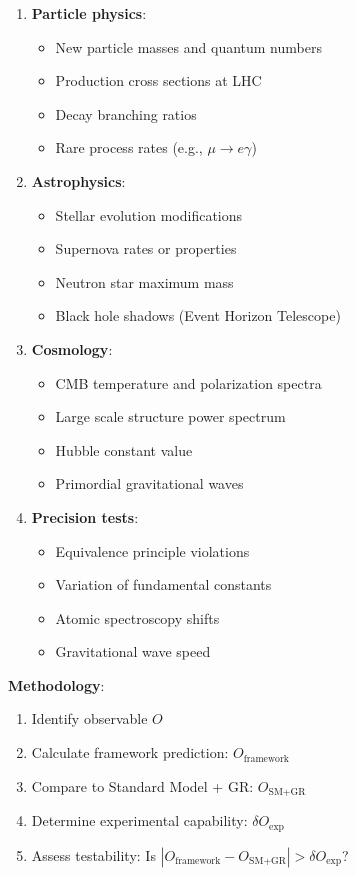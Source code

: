 \begin{enumerate}
    \item \textbf{Particle physics}:
    \begin{itemize}
        \item New particle masses and quantum numbers
        \item Production cross sections at LHC
        \item Decay branching ratios
        \item Rare process rates (e.g., $\mu \to e\gamma$)
    \end{itemize}

    \item \textbf{Astrophysics}:
    \begin{itemize}
        \item Stellar evolution modifications
        \item Supernova rates or properties
        \item Neutron star maximum mass
        \item Black hole shadows (Event Horizon Telescope)
    \end{itemize}

    \item \textbf{Cosmology}:
    \begin{itemize}
        \item CMB temperature and polarization spectra
        \item Large scale structure power spectrum
        \item Hubble constant value
        \item Primordial gravitational waves
    \end{itemize}

    \item \textbf{Precision tests}:
    \begin{itemize}
        \item Equivalence principle violations
        \item Variation of fundamental constants
        \item Atomic spectroscopy shifts
        \item Gravitational wave speed
    \end{itemize}
\end{enumerate}

\textbf{Methodology}:
\begin{enumerate}
    \item Identify observable $O$
    \item Calculate framework prediction: $O_{\text{framework}}$
    \item Compare to Standard Model + GR: $O_{\text{SM+GR}}$
    \item Determine experimental capability: $\delta O_{\text{exp}}$
    \item Assess testability: Is $|O_{\text{framework}} - O_{\text{SM+GR}}| > \delta O_{\text{exp}}$?
\end{enumerate}

